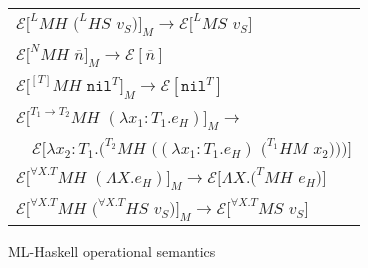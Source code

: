 \begin{figure}[p]
\centering
\begin{tabular}{l}
$\mathscr{E}[^{L}MH$ $(^{L}HS$ $v_{S})]_{M}\rightarrow\mathscr{E}[^{L}MS$ $v_{S}]$ \\
$\mathscr{E}[^{N}MH$ $\overline{n}]_{M}\rightarrow\mathscr{E}[\overline{n}]$ \\
$\mathscr{E}[^{[T]}MH$ $\mathtt{nil}^{T}]_{M}\rightarrow\mathscr{E}[\mathtt{nil}^{T}]$ \\
$\mathscr{E}[^{T_{1}\rightarrow T_{2}}MH$ $(\lambda x_{1}:T_{1}.e_{H})]_{M}\rightarrow$ \\
$\quad\mathscr{E}[\lambda x_{2}:T_{1}.(^{T_{2}}MH$ $((\lambda x_{1}:T_{1}.e_{H})$ $(^{T_{1}}HM$ $x_{2})))]$ \\
$\mathscr{E}[^{\forall X.T}MH$ $(\Lambda X.e_{H})]_{M}\rightarrow\mathscr{E}[\Lambda X.(^{T}MH$ $e_{H})]$ \\
$\mathscr{E}[^{\forall X.T}MH$ $(^{\forall X.T}HS$ $v_{S})]_{M}\rightarrow\mathscr{E}[^{\forall X.T}MS$ $v_{S}]$ \\
\end{tabular}
\caption{ML-Haskell operational semantics}
\label{mhos}
\end{figure}